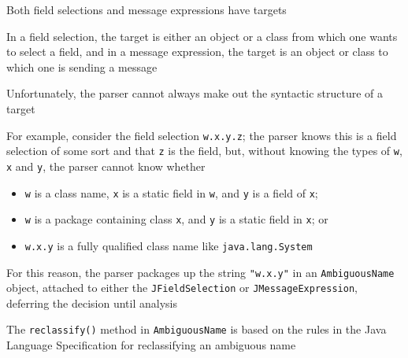 \documentclass[8pt,a4paper,compress]{beamer}
\begin{document}
\begin{frame}[fragile]
\pause

Both field selections and message expressions have targets

\pause
\bigskip

In a field selection, the target is either an object or a class from which one wants to select a field, and in a message expression, the target is an object or class to which one is sending a message

\pause
\bigskip

Unfortunately, the parser cannot always make out the syntactic structure of a target

\pause
\bigskip

For example, consider the field selection \lstinline{w.x.y.z}; the parser knows this is a field selection of some sort and that \lstinline{z} is the field, but, without knowing the types of \lstinline{w}, \lstinline{x} and \lstinline{y}, the parser cannot know whether
\begin{itemize}
\item \lstinline{w} is a class name,  \lstinline{x} is a static field in \lstinline{w}, and \lstinline{y} is a field of \lstinline{x};
\item \lstinline{w} is a package containing class \lstinline{x}, and \lstinline{y} is a static field in \lstinline{x}; or
\item \lstinline{w.x.y} is a fully qualified class name like \lstinline{java.lang.System}
\end{itemize}

\pause
\bigskip

For this reason, the parser packages up the string \lstinline{"w.x.y"} in an \lstinline{AmbiguousName} object, attached to either the \lstinline{JFieldSelection} or \lstinline{JMessageExpression}, deferring the decision until analysis

\pause
\bigskip

The \lstinline{reclassify()} method in \lstinline{AmbiguousName} is based on the rules in the Java Language Specification for reclassifying an ambiguous name
\end{frame}
\end{document}
